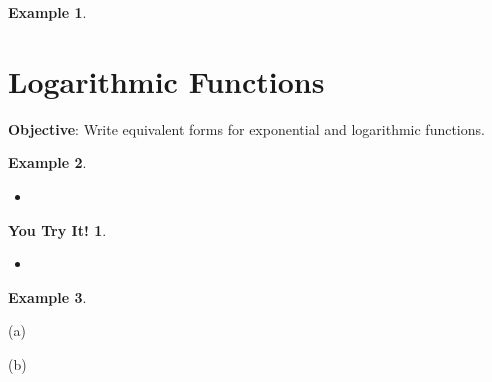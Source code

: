 \documentclass{report}
\theoremstyle{definition}
\newtheorem{example}{\bf Example}
\newtheorem{youtry}{\bf You Try It!}
\begin{document}
\begin{example}

\end{example}

\vfill



 \noindent{}
 \newpage

 \section{ Logarithmic Functions  }
  \indent\hfill\small\noindent \textbf{Objective}: Write equivalent forms for exponential and logarithmic functions. \normalsize\\
 \setcounter{example}{0}
 \setcounter{definition}{0}
 
\hspace{-0.5cm}\begin{minipage}[t]{0.45\linewidth}
	 \begin{example}

	 \end{example}
	 \begin{itemize}
	 	\item[(a)] 
	 \end{itemize}
\end{minipage}
\hspace{1.25cm}
 \begin{minipage}[t]{0.45\linewidth}
 	 \begin{youtry}

 	 \end{youtry}
	 \begin{itemize}
	 	\item[(b)]
	 \end{itemize}
\end{minipage}
 \vfill
 \begin{example}

 \end{example}
 
\begin{minipage}[t]{0.45\linewidth}
(a) 
\end{minipage}
 \hfill
 \begin{minipage}[t]{0.45\linewidth}
(b) 
\end{minipage}
\vfill
 \vfill
 
\end{document}
